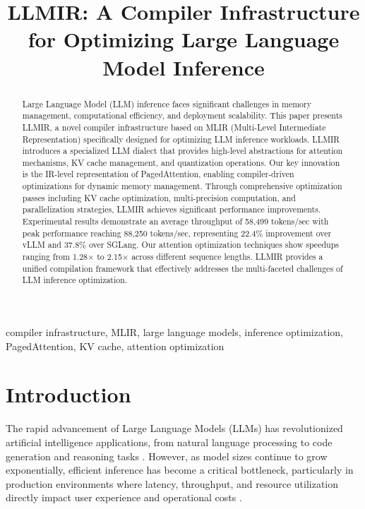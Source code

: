 \documentclass[conference]{IEEEtran}
\begin{document}
\title{LLMIR: A Compiler Infrastructure for Optimizing Large Language Model Inference}

\author{
}

\maketitle

\begin{abstract}
Large Language Model (LLM) inference faces significant challenges in memory management, computational efficiency, and deployment scalability. This paper presents LLMIR, a novel compiler infrastructure based on MLIR (Multi-Level Intermediate Representation) specifically designed for optimizing LLM inference workloads. LLMIR introduces a specialized LLM dialect that provides high-level abstractions for attention mechanisms, KV cache management, and quantization operations. Our key innovation is the IR-level representation of PagedAttention, enabling compiler-driven optimizations for dynamic memory management. Through comprehensive optimization passes including KV cache optimization, multi-precision computation, and parallelization strategies, LLMIR achieves significant performance improvements. Experimental results demonstrate an average throughput of 58,499 tokens/sec with peak performance reaching 88,250 tokens/sec, representing 22.4\% improvement over vLLM and 37.8\% over SGLang. Our attention optimization techniques show speedups ranging from 1.28× to 2.15× across different sequence lengths. LLMIR provides a unified compilation framework that effectively addresses the multi-faceted challenges of LLM inference optimization.
\end{abstract}

\begin{IEEEkeywords}
compiler infrastructure, MLIR, large language models, inference optimization, PagedAttention, KV cache, attention optimization
\end{IEEEkeywords}

\section{Introduction}

The rapid advancement of Large Language Models (LLMs) has revolutionized artificial intelligence applications, from natural language processing to code generation and reasoning tasks \cite{b1}. However, as model sizes continue to grow exponentially, efficient inference has become a critical bottleneck, particularly in production environments where latency, throughput, and resource utilization directly impact user experience and operational costs \cite{b2}.
\end{document}
